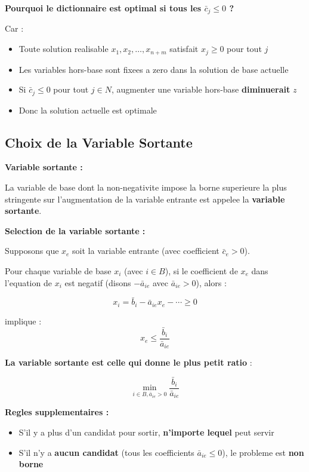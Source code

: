 \documentclass[12pt,a4paper]{article}
\begin{document}
\begin{astuce}
\textbf{Pourquoi le dictionnaire est optimal si tous les $\bar{c}_j \leq 0$ ?}

Car :
\begin{itemize}
    \item Toute solution realisable $x_1, x_2, \ldots, x_{n+m}$ satisfait $x_j \geq 0$ pour tout $j$
    \item Les variables hors-base sont fixees a zero dans la solution de base actuelle
    \item Si $\bar{c}_j \leq 0$ pour tout $j \in N$, augmenter une variable hors-base \textcolor{importantrouge}{\textbf{diminuerait}} $z$
    \item Donc la solution actuelle est optimale
\end{itemize}
\end{astuce}

\newpage
\subsection{Choix de la Variable Sortante}

\begin{definition}
\textbf{Variable sortante :}

La variable de base dont la non-negativite impose la borne superieure la plus stringente sur l'augmentation de la variable entrante est appelee la \textcolor{importantrouge}{\textbf{variable sortante}}.
\end{definition}

\begin{methode}
\textbf{Selection de la variable sortante :}

Supposons que $x_e$ soit la variable entrante (avec coefficient $\bar{c}_e > 0$).

Pour chaque variable de base $x_i$ (avec $i \in B$), si le coefficient de $x_e$ dans l'equation de $x_i$ est negatif (disons $-\bar{a}_{ie}$ avec $\bar{a}_{ie} > 0$), alors :

$$x_i = \bar{b}_i - \bar{a}_{ie}x_e - \cdots \geq 0$$

implique :
$$x_e \leq \frac{\bar{b}_i}{\bar{a}_{ie}}$$

\textbf{La variable sortante est celle qui donne le \textcolor{importantrouge}{plus petit} ratio} :

$$\min_{i \in B, \bar{a}_{ie} > 0} \frac{\bar{b}_i}{\bar{a}_{ie}}$$

\textbf{Regles supplementaires :}
\begin{itemize}
    \item S'il y a plus d'un candidat pour sortir, \textcolor{defvert}{\textbf{n'importe lequel}} peut servir
    \item S'il n'y a \textcolor{importantrouge}{\textbf{aucun candidat}} (tous les coefficients $\bar{a}_{ie} \leq 0$), le probleme est \textcolor{importantrouge}{\textbf{non borne}}
\end{itemize}
\end{methode}
\end{document}
